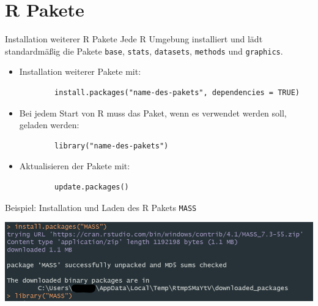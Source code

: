\documentclass[xcolor=dvipsnames, aspectratio = 169]{beamer}
\begin{document}

	


\section{\textsf R Pakete}


\begin{frame}[fragile]{Installation weiterer \textsf R Pakete}
    Jede \textsf R Umgebung installiert und lädt standardmäßig die Pakete \texttt{base}, \texttt{stats}, \texttt{datasets}, \texttt{methods} und \texttt{graphics}.\bigskip
    \begin{itemize}
        \item Installation weiterer Pakete mit:
        \begin{verbatim}
        install.packages("name-des-pakets", dependencies = TRUE)
        \end{verbatim}
        \item Bei jedem Start von \textsf R muss das Paket, wenn es verwendet werden soll, geladen werden:
        \begin{verbatim}
        library("name-des-pakets")
        \end{verbatim}
        \item Aktualisieren der Pakete mit:
        \begin{verbatim}
        update.packages()
        \end{verbatim}
    \end{itemize}
\end{frame}

\begin{frame}[fragile]{Beispiel: Installation und Laden des \textsf R Pakets \texttt{MASS}}
    \begin{center}
        \includegraphics[width=\textwidth, keepaspectratio]{pakete.png}
    \end{center}
\end{frame}
\end{document}
